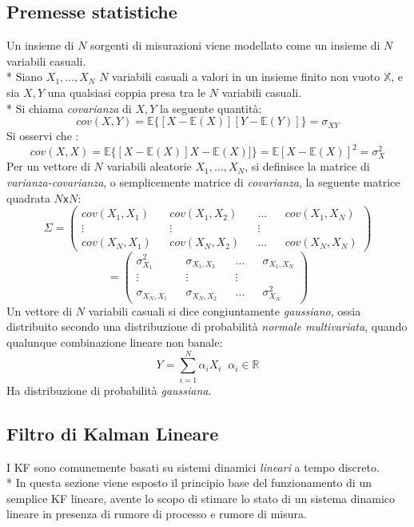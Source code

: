 \subsection{Premesse statistiche}
Un insieme di $N$ sorgenti di misurazioni viene modellato come un insieme di $N$ variabili casuali.\\*
Siano $X_1,\dots,X_N$ $N$ variabili casuali a valori in un insieme finito non vuoto $\mathbb{X}$, e sia $X,Y$ una qualsiasi coppia presa tra le $N$ variabili casuali.\\*
Si chiama \emph{covarianza} di $X,Y$ la seguente quantit\`a:
$$
cov(X,Y) = \mathbb{E}\{[X-\mathbb{E}(X)][Y-\mathbb{E}(Y)]\}= \sigma_{XY}
$$
Si osservi che :
$$
cov(X,X) =  \mathbb{E}\{[X-\mathbb{E}(X)]X-\mathbb{E}(X)]\} = \mathbb{E}[X-\mathbb{E}(X)]^2 =\sigma^2_{X}
$$
Per un vettore di $N$ variabili aleatorie $X_1,\dots,X_N$, si definisce la matrice di \emph{varianza-covarianza}, o semplicemente matrice di \emph{covarianza}, la seguente matrice quadrata $N$\texttt{x}$N$:
$$
\Sigma = \left(\begin{matrix}
cov(X_1,X_1) && cov(X_1,X_2) && \dots && cov(X_1,X_N) \\
\vdots && \vdots && \vdots \\
cov(X_N,X_1) && cov(X_N, X_2) && \dots && cov(X_N,X_N)
\end{matrix}\right) 
$$
$$
 = \left(\begin{matrix}
\sigma^2_{X_1} && \sigma_{X_1,X_2} && \dots && \sigma_{X_1,X_N} \\
\vdots && \vdots && \vdots \\
\sigma_{X_N,X_1} && \sigma_{X_N, X_2} && \dots && \sigma^2_{X_N}
\end{matrix}\right)
$$
Un vettore di $N$ variabili casuali si dice congiuntamente \emph{gaussiano}, ossia distribuito secondo una distribuzione di probabilit\`a \emph{normale multivariata}, quando qualunque combinazione lineare non banale:
$$
Y = \sum_{i=1}^N \alpha_iX_i\;\;\alpha_i \in \mathbb{R}
$$
Ha distribuzione di probabilit\`a \emph{gaussiana}.
\subsection{Filtro di Kalman Lineare}
I KF sono comunemente basati su sistemi dinamici \emph{lineari} a tempo discreto.\\*
In questa sezione viene esposto il principio base del funzionamento di un semplice KF lineare, avente lo scopo di stimare lo stato di un sistema dinamico lineare in presenza di rumore di processo e rumore di misura.
